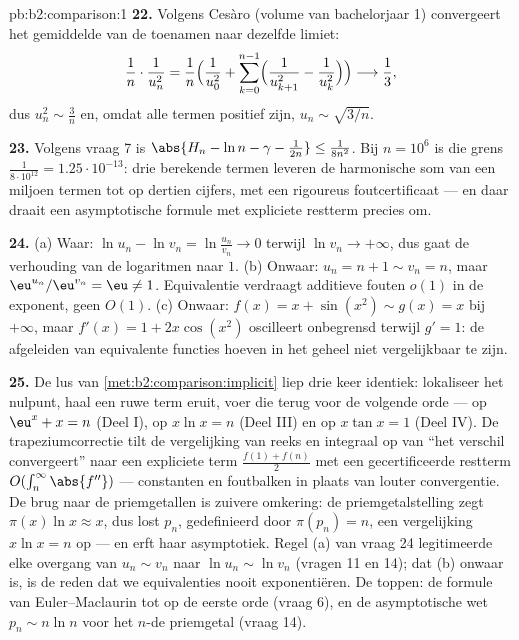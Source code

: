 \begin{solution}{pb:b2:comparison:1}
\textbf{22.} Volgens Cesàro (volume van bachelorjaar 1)
convergeert het gemiddelde van de toenamen naar dezelfde limiet:
\[
\frac{1}{n}\cdot\frac{1}{u_n^2}
= \frac1n\Bigl(\frac1{u_0^2} + \sum_{k=0}^{n-1}
\Bigl(\frac1{u_{k+1}^2} - \frac1{u_k^2}\Bigr)\Bigr)
\longrightarrow \frac13 ,
\]
dus $u_n^2 \sim \frac3n$ en, omdat alle termen positief zijn, $u_n
\sim \sqrt{3/n}$.

\textbf{23.} Volgens vraag 7 is $\abs{H_n - \ln n - \gamma -
\frac1{2n}} \leq \frac1{8n^2}$. Bij $n = 10^6$ is die grens
$\frac{1}{8\cdot10^{12}} = 1.25\cdot10^{-13}$: drie berekende
termen leveren de harmonische som van een miljoen termen tot op
dertien cijfers, met een  rigoureus foutcertificaat --- en
daar draait een asymptotische formule met expliciete restterm
precies om.

\textbf{24.} (a) Waar: $\ln u_n - \ln v_n = \ln\frac{u_n}{v_n} \to
0$ terwijl $\ln v_n \to +\infty$, dus gaat de verhouding van de
logaritmen naar $1$. (b) Onwaar: $u_n = n + 1 \sim v_n = n$, maar
$\eu^{u_n}/\eu^{v_n} = \eu \neq 1$. Equivalentie verdraagt
additieve fouten $o(1)$ in de exponent, geen $O(1)$. (c) Onwaar:
$f(x) = x + \sin(x^2) \sim g(x) = x$ bij $+\infty$, maar $f'(x) = 1
+ 2x\cos(x^2)$ oscilleert onbegrensd terwijl $g' = 1$: de
afgeleiden van equivalente functies hoeven in het geheel niet
vergelijkbaar te zijn.

\textbf{25.} De lus van \cref{met:b2:comparison:implicit} liep drie
keer identiek: lokaliseer het nulpunt, haal een ruwe term eruit,
voer die terug voor de volgende orde --- op $\eu^x + x = n$ (Deel
I), op $x\ln x = n$ (Deel III) en op $x\tan x = 1$ (Deel IV). De
trapeziumcorrectie tilt de vergelijking van reeks en integraal op
van ``het verschil convergeert'' naar een expliciete term
$\frac{f(1) + f(n)}2$ met een gecertificeerde restterm
$O(\int_n^\infty \abs{f''})$ --- constanten en foutbalken in plaats
van louter convergentie. De brug naar de priemgetallen is zuivere
omkering: de priemgetalstelling zegt $\pi(x)\ln x \approx x$, dus
lost $p_n$, gedefinieerd door $\pi(p_n) = n$, een vergelijking
$x\ln x = n$ op --- en erft haar asymptotiek. Regel (a) van vraag
24 legitimeerde elke overgang van $u_n \sim v_n$ naar $\ln u_n \sim
\ln v_n$ (vragen 11 en 14); dat (b) onwaar is, is de reden dat we
equivalenties nooit exponentiëren. De toppen: de formule van
Euler--Maclaurin tot op de eerste orde (vraag 6), en de
asymptotische wet $p_n \sim n\ln n$ voor het $n$-de priemgetal
(vraag 14).
\end{solution}
